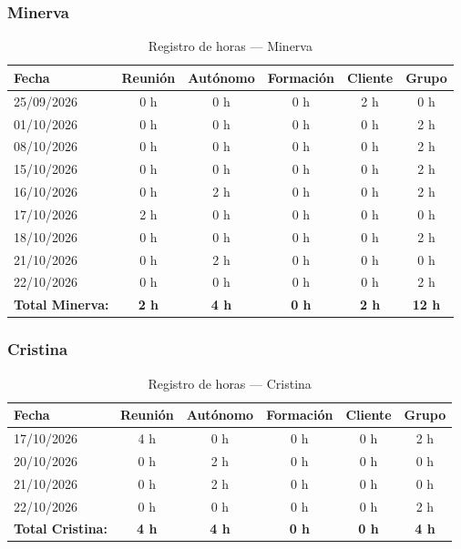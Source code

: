 \subsubsection{Minerva}
\begin{table}[H]
\centering
\small
\begin{tabularx}{\textwidth}{l c c c c c}
\toprule
\textbf{Fecha} & \textbf{Reunión} & \textbf{Autónomo} & \textbf{Formación} & \textbf{Cliente} & \textbf{Grupo} \\
\midrule
25/09/2026 & 0 h & 0 h & 0 h & 2 h & 0 h \\
01/10/2026 & 0 h & 0 h & 0 h & 0 h & 2 h \\
08/10/2026 & 0 h & 0 h & 0 h & 0 h & 2 h \\
15/10/2026 & 0 h & 0 h & 0 h & 0 h & 2 h \\
16/10/2026 & 0 h & 2 h & 0 h & 0 h & 2 h \\
17/10/2026 & 2 h & 0 h & 0 h & 0 h & 0 h \\
18/10/2026 & 0 h & 0 h & 0 h & 0 h & 2 h \\
21/10/2026 & 0 h & 2 h & 0 h & 0 h & 0 h \\
22/10/2026 & 0 h & 0 h & 0 h & 0 h & 2 h \\
\midrule
\textbf{Total Minerva:} & \textbf{2 h} & \textbf{4 h} & \textbf{0 h} & \textbf{2 h} & \textbf{12 h} \\
\bottomrule
\end{tabularx}
\caption{Registro de horas — Minerva}
\end{table}

\subsubsection{Cristina}
\begin{table}[H]
\centering
\small
\begin{tabularx}{\textwidth}{l c c c c c}
\toprule
\textbf{Fecha} & \textbf{Reunión} & \textbf{Autónomo} & \textbf{Formación} & \textbf{Cliente} & \textbf{Grupo} \\
\midrule
17/10/2026 & 4 h & 0 h & 0 h & 0 h & 2 h \\
20/10/2026 & 0 h & 2 h & 0 h & 0 h & 0 h \\
21/10/2026 & 0 h & 2 h & 0 h & 0 h & 0 h \\
22/10/2026 & 0 h & 0 h & 0 h & 0 h & 2 h \\
\midrule
\textbf{Total Cristina:} & \textbf{4 h} & \textbf{4 h} & \textbf{0 h} & \textbf{0 h} & \textbf{4 h} \\
\bottomrule
\end{tabularx}
\caption{Registro de horas — Cristina}
\end{table}

